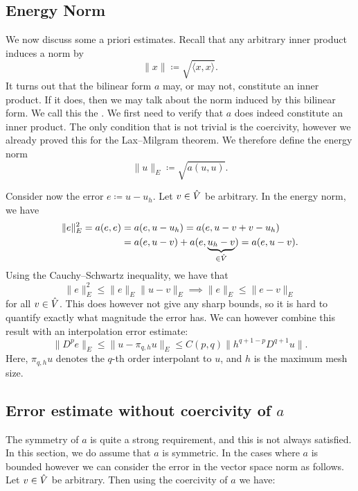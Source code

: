 \subsection{Energy Norm}
We now discuss some a priori estimates. Recall that any arbitrary inner product
induces a norm by
\begin{equation}
    \| x \| \coloneqq \sqrt{ \langle x, x \rangle }.
\end{equation}
It turns out that the bilinear form \( a \) may, or may not, constitute an
inner product. If it does, then we may talk about the norm induced by this
bilinear form.  We call this the . We first need to verify
that \( a \) does indeed constitute an inner product. The only condition that
is not trivial is the coercivity, however we already proved this for the
Lax--Milgram theorem. We therefore define the energy norm
\begin{equation}
    \|u\|_E \coloneqq \sqrt{a(u, u)}.
\end{equation}

Consider now the error \( e \coloneqq u - u_h \). Let \(v \in \hat{V}\) be
arbitrary. In the energy norm, we have
\begin{align}
    \| e \|_E^2 = a(e, e) &= a(e, u - u_h) = a(e, u - v + v - u_h) \\
                          &= a(e, u - v) + a(e, \underbrace{u_h - v}_{\in \hat{V}}) = a(e, u-v).
\end{align}
Using the Cauchy--Schwartz inequality, we have that
\begin{equation}
     \| e \|_E^2 \leq \|e\|_E \|u - v\|_E \implies \| e \|_E \leq \|e - v\|_E
\end{equation}
for all \( v \in \hat{V} \). This does however not give any sharp bounds, so it
is hard to quantify exactly what magnitude the error has. We can however
combine this result with an interpolation error estimate:
\begin{equation}
    \| D^p e \|_E \leq \| u - \pi_{q, h} u\|_E \leq C(p, q) \| h^{q + 1-p}
    D^{q+1} u\|.
\end{equation}
Here, \( \pi_{q, h} u\) denotes the \( q \)-th order interpolant to \( u \),
and \( h \) is the maximum mesh size.


\subsection{Error estimate without coercivity of \(a\)}
\label{ssec:error_estimate_cea}
The symmetry of \( a \) is quite a strong requirement, and this is not always
satisfied. In this section, we do  assume that \( a \) is symmetric.
In the cases where \( a \) is bounded however we can consider the error in the
vector space norm as follows. Let \( v \in \hat{V} \) be arbitrary. Then using
the coercivity of \( a \) we have:

